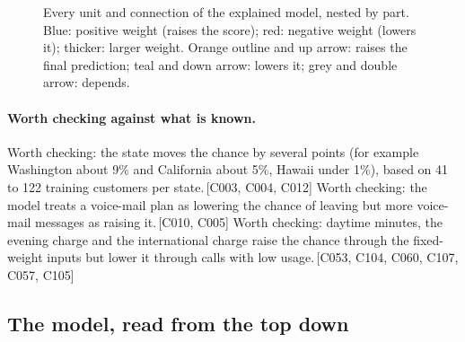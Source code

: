 \documentclass[a4paper,10pt]{article}
\newif\ifreviewmarks
\newcommand{\reviewrule}{\noindent{\color{BrickRed}\rule{\linewidth}{0.8pt}}}
\newenvironment{drafted}[1][]{%
  \ifreviewmarks\par\addvspace{\medskipamount}\reviewrule\par\nopagebreak
  \noindent{\color{BrickRed}\sffamily\footnotesize\textbf{Thesis Draft}\quad #1\hfill review}\par\nopagebreak\smallskip\fi}{%
  \ifreviewmarks\par\smallskip\noindent{\color{BrickRed}\sffamily\footnotesize end of thesis draft}\par\nopagebreak\reviewrule\par\medskip\fi}
\begin{document}
\begin{drafted}[plain-language layer: churn100-s2-c2]
\begin{landscape}
\begin{figure}[p]
{}%
\caption{Every unit and connection of the explained model, nested by part. Blue: positive weight (raises the score); red: negative weight (lowers it); thicker: larger weight. Orange outline and up arrow: raises the final prediction; teal and down arrow: lowers it; grey and double arrow: depends.}
\label{fig:churn100s2c2:overview}
\end{figure}
\end{landscape}
\paragraph{Worth checking against what is known.} Worth checking: the state moves the chance by several points (for example Washington about 9\% and California about 5\%, Hawaii under 1\%), based on 41 to 122 training customers per state.\,{\scriptsize\textcolor{NavyBlue}{[C003, C004, C012]}} Worth checking: the model treats a voice-mail plan as lowering the chance of leaving but more voice-mail messages as raising it.\,{\scriptsize\textcolor{NavyBlue}{[C010, C005]}} Worth checking: daytime minutes, the evening charge and the international charge raise the chance through the fixed-weight inputs but lower it through calls with low usage.\,{\scriptsize\textcolor{NavyBlue}{[C053, C104, C060, C107, C057, C105]}}
\subsection{The model, read from the top down}

\end{drafted}
\end{document}

